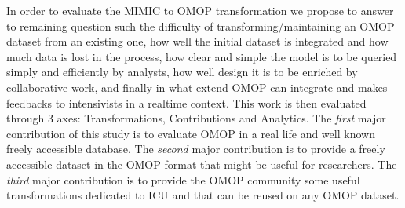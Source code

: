 In order to evaluate the MIMIC to OMOP transformation we propose to answer to
remaining question such the difficulty of transforming/maintaining an OMOP
dataset from an existing one, how well the initial dataset is integrated and
how much data is lost in the process, how clear and simple the model is to be
queried simply and efficiently by analysts, how well design it is to be
enriched by collaborative work, and finally in what extend OMOP can integrate
and makes feedbacks to intensivists in a realtime context.  This work is then
evaluated through 3 axes: Transformations, Contributions and Analytics.
The \emph{first} major contribution of this study is to evaluate OMOP in a real
life and well known freely accessible database. The \emph{second} major
contribution is to provide a freely accessible dataset in the OMOP format that
might be useful for researchers. The \emph{third} major contribution is to
provide the OMOP community some useful transformations dedicated to ICU and
that can be reused on any OMOP dataset.
